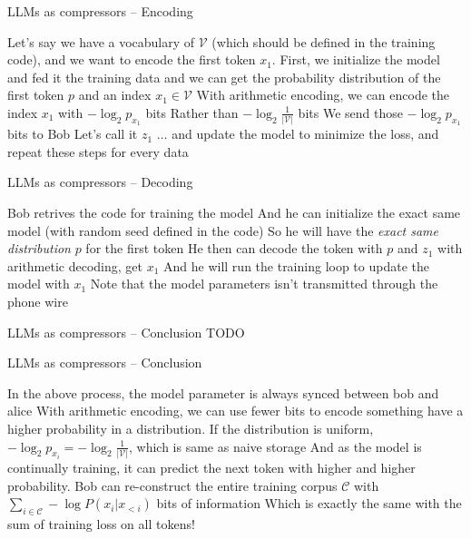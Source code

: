 \documentclass[scheme=plain]{ctexbeamer}
\begin{document}
\begin{frame}{LLMs as compressors -- Encoding}
  \begin{outline}
    \1 Let's say we have a vocabulary of \(\mathcal{V}\) (which should be defined in the training code), and we want to encode the first token \(x_1\).
    \pause
    \1 First, we initialize the model and fed it the training data
      \2 and we can get the probability distribution of the first token $p$ and an index $x_1 \in \mathcal{V}$
      \pause
    \1 With arithmetic encoding, we can encode the index $x_1$ with $-\log_2 p_{x_1}$ bits
      \2 Rather than $-\log_2 \frac{1}{|\mathcal{V}|}$ bits
      \pause
    \1 We send those $-\log_2 p_{x_1}$ bits to Bob
      \2 Let's call it $z_1$
      \pause
    \1 $\dots$ and update the model to minimize the loss, and repeat these steps for every data
  \end{outline}
\end{frame}

\begin{frame}{LLMs as compressors -- Decoding}
  \begin{outline}
    \1 Bob retrives the code for training the model
    \pause
    \1 And he can initialize the exact same model (with random seed defined in the code)
    \pause
    \1 So he will have the \emph{exact same distribution} $p$ for the first token
      \2 He then can decode the token with $p$ and $z_1$ with arithmetic decoding, get $x_1$
      \pause
    \1 And he will run the training loop to update the model with $x_1$
    \1 Note that the model parameters isn't transmitted through the phone wire
  \end{outline}
\end{frame}

\begin{frame}{LLMs as compressors -- Conclusion}
  TODO
\end{frame}

\begin{frame}{LLMs as compressors -- Conclusion}
  \begin{outline}
    \1 In the above process, the model parameter is always synced between bob and alice
    \1 With arithmetic encoding, we can use fewer bits to encode something have a higher probability in a distribution.
      \2 If the distribution is uniform, $-\log_2 p_{x_i} = -\log_2 \frac{1}{|\mathcal{V}|}$, which is same as naive storage
      \2 And as the model is continually training, it can predict the next token with higher and higher probability.
    \1 Bob can re-construct the entire training corpus $\mathcal{C}$ with $\sum_{i \in \mathcal{C}} - \log P(x_i | x_{<i}) $ bits of information
      \2 Which is exactly the same with the sum of training loss on all tokens!
  \end{outline}
\end{frame}
\end{document}
